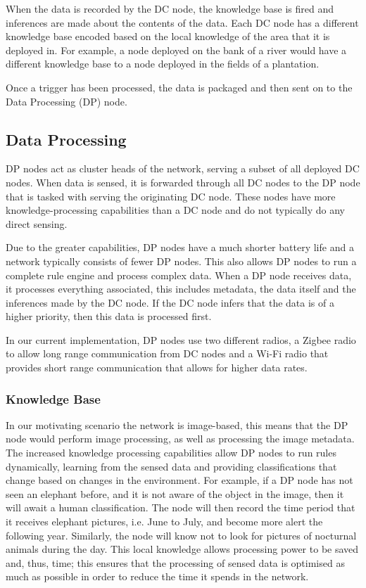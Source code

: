When the data is recorded by the DC node, the knowledge base is fired and inferences are made about the contents of the data. Each DC node has a different knowledge base encoded based on the local knowledge of the area that it is deployed in.  For example, a node deployed on the bank of a river would have a different knowledge base to a node deployed in the fields of a plantation.

Once a trigger has been processed, the data is packaged and then sent on to the Data Processing (DP) node.

	\subsection{Data Processing}
	DP nodes act as cluster heads of the network, serving a subset of all deployed DC nodes. When data is sensed, it is forwarded through all DC nodes to the DP node that is tasked with serving the originating DC node. These nodes have more knowledge-processing capabilities than a DC node and do not typically do any direct sensing. 

	Due to the greater capabilities, DP nodes have a much shorter battery life and a network typically consists of fewer DP nodes. This also allows DP nodes to run a complete rule engine and process complex data. When a DP node receives data, it processes everything associated, this includes metadata, the data itself and the inferences made by the DC node. If the DC node infers that the data is of a higher priority, then this data is processed first.

	In our current implementation, DP nodes use two different radios, a Zigbee radio to allow long range communication from DC nodes and a Wi-Fi radio that provides short range communication that allows for higher data rates.

	\subsubsection{Knowledge Base}
	In our motivating scenario the network is image-based, this means that the DP node would perform image processing, as well as processing the image metadata. The increased knowledge processing capabilities allow DP nodes to run rules dynamically, learning from the sensed data and providing classifications that change based on changes in the environment. For example, if a DP node has not seen an elephant before, and it is not aware of the object in the image, then it will await a human classification. The node will then record the time period that it receives elephant pictures, i.e. June to July, and become more alert the following year. Similarly, the node will know not to look for pictures of nocturnal animals during the day. This local knowledge allows processing power to be saved and, thus, time; this ensures that the processing of sensed data is optimised as much as possible in order to reduce the time it spends in the network.
	
